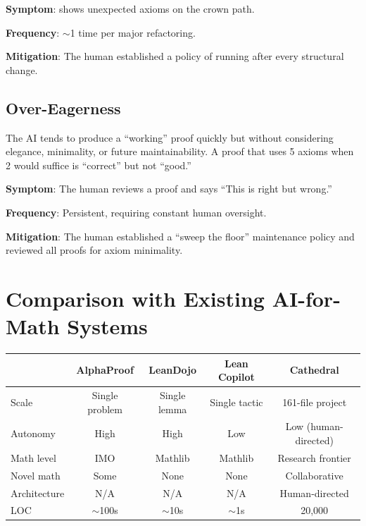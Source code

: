 \documentclass[11pt,a4paper]{article}
\begin{document}
\textbf{Symptom}:  shows unexpected axioms on
the crown path.

\textbf{Frequency}: $\sim$1 time per major refactoring.

\textbf{Mitigation}: The human established a policy of running
 after every structural change.

\subsection{Over-Eagerness}

The AI tends to produce a ``working'' proof quickly but without
considering elegance, minimality, or future maintainability. A proof
that uses 5 axioms when 2 would suffice is ``correct'' but not
``good.''

\textbf{Symptom}: The human reviews a proof and says ``This is
right but wrong.''

\textbf{Frequency}: Persistent, requiring constant human oversight.

\textbf{Mitigation}: The human established a ``sweep the floor''
maintenance policy and reviewed all proofs for axiom minimality.

\section{Comparison with Existing AI-for-Math Systems}
\label{sec:comparison}

\begin{center}
\small
\begin{tabular}{@{}lcccc@{}}
\toprule
& \textbf{AlphaProof} & \textbf{LeanDojo} & \textbf{Lean Copilot} & \textbf{Cathedral} \\
\midrule
Scale & Single problem & Single lemma & Single tactic & 161-file project \\
Autonomy & High & High & Low & Low (human-directed) \\
Math level & IMO & Mathlib & Mathlib & Research frontier \\
Novel math & Some & None & None & Collaborative \\
Architecture & N/A & N/A & N/A & Human-directed \\
LOC & $\sim$100s & $\sim$10s & $\sim$1s & 20,000 \\
\bottomrule
\end{tabular}
\end{center}
\end{document}
